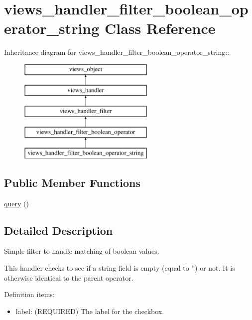 \hypertarget{classviews__handler__filter__boolean__operator__string}{
\section{views\_\-handler\_\-filter\_\-boolean\_\-operator\_\-string Class Reference}
\label{classviews__handler__filter__boolean__operator__string}
}
Inheritance diagram for views\_\-handler\_\-filter\_\-boolean\_\-operator\_\-string::\begin{figure}[H]
\begin{center}
\leavevmode
\includegraphics[height=5cm]{classviews__handler__filter__boolean__operator__string}
\end{center}
\end{figure}
\subsection*{Public Member Functions}
\begin{CompactItemize}
\item 
\hyperlink{classviews__handler__filter__boolean__operator__string_d4d0444476749372e38591ad058ee1cd}{query} ()
\end{CompactItemize}


\subsection{Detailed Description}
Simple filter to handle matching of boolean values.

This handler checks to see if a string field is empty (equal to '') or not. It is otherwise identical to the parent operator.

Definition items:\begin{itemize}
\item label: (REQUIRED) The label for the checkbox. \end{itemize}



